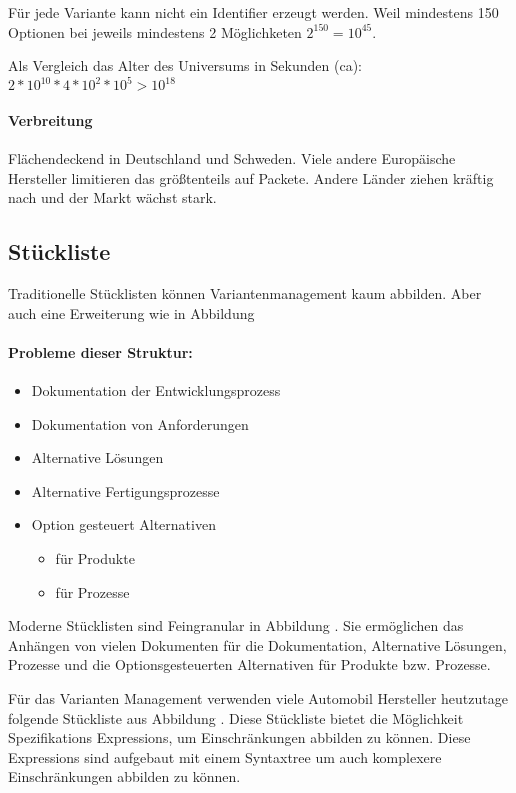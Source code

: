 Für jede Variante kann nicht ein Identifier erzeugt werden. Weil mindestens 150 Optionen bei jeweils mindestens 2 Möglichketen $2^{150} = 10^{45}$.

Als Vergleich das Alter des Universums in Sekunden (ca): $2*10^{10}*4*10^{2}*10^5>10^{18}$

\paragraph{Verbreitung}
Flächendeckend in Deutschland und Schweden. Viele andere Europäische Hersteller limitieren das größtenteils auf Packete. Andere Länder ziehen kräftig nach und der Markt wächst stark.

\newpage
\subsection{Stückliste}
Traditionelle Stücklisten können Variantenmanagement kaum abbilden. Aber auch eine Erweiterung wie in Abbildung 


\paragraph{Probleme dieser Struktur:}
\begin{itemize}
\item Dokumentation der Entwicklungsprozess 
\item Dokumentation von Anforderungen 
\item Alternative Lösungen 
\item Alternative Fertigungsprozesse 
\item{
Option gesteuert Alternativen 
\begin{itemize}
\item für Produkte 
\item für Prozesse
\end{itemize}
}
\end{itemize}

\newpage
Moderne Stücklisten sind Feingranular in Abbildung . Sie ermöglichen das Anhängen von vielen Dokumenten für die Dokumentation, Alternative Lösungen, Prozesse und die Optionsgesteuerten Alternativen für Produkte bzw. Prozesse.


\newpage
Für das Varianten Management verwenden viele Automobil Hersteller heutzutage folgende Stückliste aus Abbildung . Diese Stückliste bietet die Möglichkeit Spezifikations Expressions, um Einschränkungen abbilden zu können. Diese Expressions sind aufgebaut mit einem Syntaxtree um auch komplexere Einschränkungen abbilden zu können.

